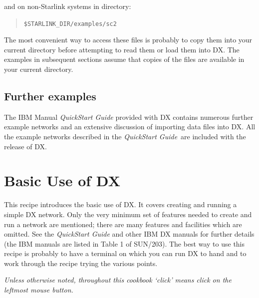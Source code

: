 \documentclass[twoside,11pt]{article}
\newcommand{\xref}[3]{#1}
\newcommand{\xlabel}[1]{}
\begin{document}
and on non-Starlink systems in directory:
\begin{quote}
{\tt \$STARLINK\_DIR/examples/sc2}
\end{quote}

The most convenient way to access these files is probably to copy them
into your current directory before attempting to read them or load
them into DX.  The examples in subsequent sections assume that copies
of the files are available in your current directory.

\subsection{Further examples}

The IBM Manual {\it QuickStart Guide}\cite{QUICKS} provided with DX contains
numerous further example networks and an extensive discussion of
importing data files into DX. All the example networks described in the
{\it QuickStart Guide}\, are included with the release of DX.


\newpage
\section{\xlabel{BASIC}\label{BASIC}Basic Use of DX}

This recipe introduces the basic use of DX. It covers creating and
running a simple DX network. Only the very minimum set of features needed
to create and run a network are mentioned; there are many features and
facilities which are omitted. See the {\it QuickStart Guide}\cite{QUICKS}
and other IBM DX manuals for further details (the IBM manuals are listed
in Table 1 of \xref{SUN/203}{sun203}{}\cite{SUN203}). The best way to use
this recipe is probably to have a terminal on which you can run DX to
hand and to work through the recipe trying the various points.

{\it Unless otherwise noted, throughout this cookbook `click' means click
on the leftmost mouse button.}
\end{document}
